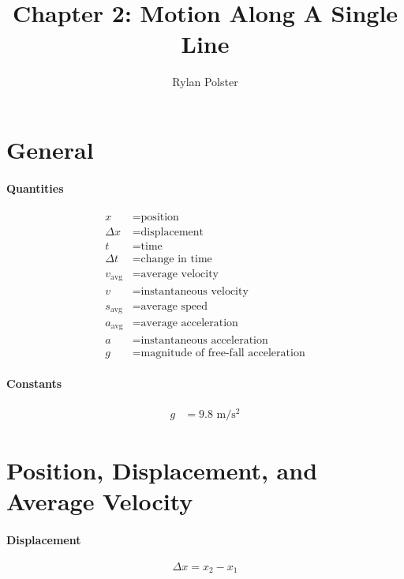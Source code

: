 \documentclass{article}
\title{Chapter 2: Motion Along A Single Line}
\author{Rylan Polster}
\begin{document}
    \maketitle
    
    \section*{General}

        \paragraph{Quantities}
        \begin{align}
            x &= \text{position} \nonumber\\
            \Delta x &= \text{displacement} \nonumber\\
            t &= \text{time} \nonumber\\
            \Delta t &= \text{change in time} \nonumber\\
            v_{\text{avg}} &= \text{average velocity} \nonumber\\
            v &= \text{instantaneous velocity} \nonumber\\
            s_{\text{avg}} &= \text{average speed} \nonumber\\
            a_{\text{avg}} &= \text{average acceleration} \nonumber\\
            a &= \text{instantaneous acceleration} \nonumber\\
            g &= \text{magnitude of free-fall acceleration} \nonumber
        \end{align}

        \paragraph{Constants}
        \begin{align}
            g &= 9.8 \text{ m}/\text{s}^2 \nonumber
        \end{align}

    \section{Position, Displacement, and Average Velocity}

        \paragraph{Displacement}
        \begin{equation}
            \Delta x = x_2 - x_1
        \end{equation}
\end{document}
